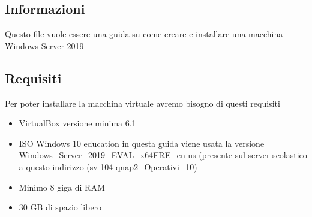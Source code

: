 \documentclass[../main.tex]{subfiles}
\begin{document}
\subsection{Informazioni}
Questo file vuole essere una guida su come creare e installare una macchina Windows Server 2019

\subsection{Requisiti}
Per poter installare la macchina virtuale avremo bisogno di questi requisiti

\begin{itemize}
    \item VirtualBox versione minima 6.1 
    \item ISO Windows  10 education in questa guida viene usata la versione Windows_Server_2019_EVAL_x64FRE_en-us (presente sul server scolastico a questo indirizzo (sv-104-qnap2\dati\SW\Sistemi_Operativi\Microsoft\Windows_10)
    \item Minimo 8 giga di RAM 
    \item 30 GB di spazio libero
\end{itemize}
\end{document}
